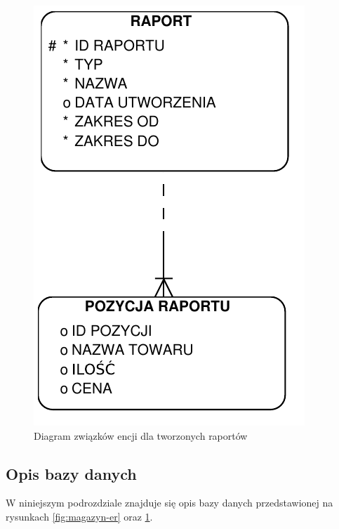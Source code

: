 \begin{figure}[!htb]
  \begin{center}
    \includegraphics[scale=0.7]{../img/model/diagram_er_raporty.pdf}
  \end{center}
  \caption{Diagram związków encji dla tworzonych raportów}
  \label{fig:raport-er}
\end{figure}
\FloatBarrier

\subsection{Opis bazy danych}
W niniejszym podrozdziale znajduje się opis bazy danych przedstawionej na
rysunkach \ref{fig:magazyn-er} oraz \ref{fig:raport-er}.

